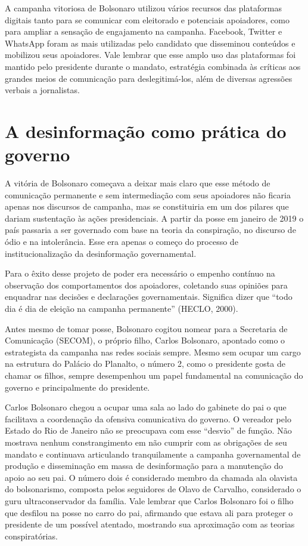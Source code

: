 A campanha vitoriosa de Bolsonaro utilizou vários recursos das
plataformas digitais tanto para se comunicar com eleitorado e potenciais
apoiadores, como para ampliar a sensação de engajamento na campanha.
Facebook, Twitter e WhatsApp foram as mais utilizadas pelo candidato que
disseminou conteúdos e mobilizou seus apoiadores. Vale lembrar que esse
amplo uso das plataformas foi mantido pelo presidente durante o mandato,
estratégia combinada às críticas aos grandes meios de comunicação para
deslegitimá-los, além de diversas agressões verbais a jornalistas.

\section{A desinformação como prática do governo }

A vitória de Bolsonaro começava a deixar mais claro que esse método de
comunicação permanente e sem intermediação com seus apoiadores não
ficaria apenas nos discursos de campanha, mas se constituiria em um dos
pilares que dariam sustentação às ações presidenciais. A partir da posse
em janeiro de 2019 o país passaria a ser governado com base na teoria da
conspiração, no discurso de ódio e na intolerância. Esse era apenas o
começo do processo de institucionalização da desinformação
governamental.

Para o êxito desse projeto de poder era necessário o empenho contínuo na
observação dos comportamentos dos apoiadores, coletando suas opiniões
para enquadrar nas decisões e declarações governamentais. Significa
dizer que ``todo dia é dia de eleição na campanha permanente'' (HECLO,
2000).

Antes mesmo de tomar posse, Bolsonaro cogitou nomear para a Secretaria
de Comunicação (SECOM), o próprio filho, Carlos Bolsonaro, apontado como
o estrategista da campanha nas redes sociais sempre. Mesmo sem ocupar um
cargo na estrutura do Palácio do Planalto, o número 2, como o presidente
gosta de chamar os filhos, sempre desempenhou um papel fundamental na
comunicação do governo e principalmente do presidente.

Carlos Bolsonaro chegou a ocupar uma sala ao lado do gabinete do pai o
que facilitava a coordenação da ofensiva comunicativa do governo. O
vereador pelo Estado do Rio de Janeiro não se preocupava com esse
``desvio'' de função. Não mostrava nenhum constrangimento em não cumprir
com as obrigações de seu mandato e continuava articulando tranquilamente
a campanha governamental de produção e disseminação em massa de
desinformação para a manutenção do apoio ao seu pai. O número dois é
considerado membro da chamada ala olavista do bolsonarismo, composta
pelos seguidores de Olavo de Carvalho, considerado o guru
ultraconservador da família. Vale lembrar que Carlos Bolsonaro foi o
filho que desfilou na posse no carro do pai, afirmando que estava ali
para proteger o presidente de um possível atentado, mostrando sua
aproximação com as teorias conspiratórias.

